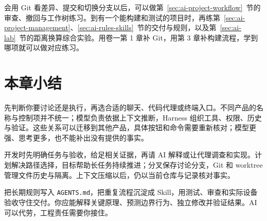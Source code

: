 会用 Git 看差异、提交和切换分支以后，可以做第~\ref{sec:ai-project-workflow}~节的审查、撤回与工作树练习。到有一个能构建和测试的项目时，再练第~\ref{sec:ai-project-management}、\ref{sec:ai-rules-skills}~节的交付与规则，以及第~\ref{sec:ai-lab}~节的距离换算综合实验。用卷一第 1 章补 Git，用第 3 章补构建流程，学到哪项就可以做对应练习。




\section{本章小结}
\begin{conclusion}
先判断你要讨论还是执行，再选合适的聊天、代码代理或终端入口。不同产品的名称与控制项并不统一；模型负责依据上下文推断，Harness 组织工具、权限、历史与验证。这些关系可以迁移到其他产品，具体按钮和命令需要重新核对；模型更强、思考更多，也不能补出没有提供的事实。

开发时先明确任务与验收，给足相关证据，再请 AI 解释或让代理调查和实现。计划解决路径选择，目标帮助长任务持续推进；分叉保存讨论分支，Git 和 worktree 管理文件历史与隔离。上下文压缩以后，仍以当前仓库与记录核对事实。

把长期规则写入 \texttt{AGENTS.md}，把重复流程沉淀成 Skill，用测试、审查和实际设备验收守住交付。你应能解释关键原理、预测边界行为、独立修改并验证结果。AI 可以代劳，工程责任需要你接住。
\end{conclusion}

